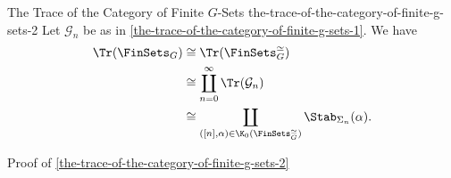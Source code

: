 \begin{example}{The Trace of the Category of Finite $G$-Sets \rmII}{the-trace-of-the-category-of-finite-g-sets-2}%
    Let $\mathcal{G}_{n}$ be as in \cref{the-trace-of-the-category-of-finite-g-sets-1}. We have
    \begin{align*}
        \Tr(\FinSets_{G}) &\cong \Tr(\FinSets^{\simeq}_{G})\\%
                          &\cong \coprod^{\infty}_{n=0}\Tr(\mathcal{G}_{n})\\
                          &\cong \coprod_{([n],\alpha)\in\K_{0}(\FinSets^{\simeq}_{G})}\Stab_{\Sigma_{n}}(\alpha).%
    \end{align*}
\end{example}
\begin{Proof}{Proof of \cref{the-trace-of-the-category-of-finite-g-sets-2}}%
\end{Proof}
\begin{appendices}

\end{appendices}

